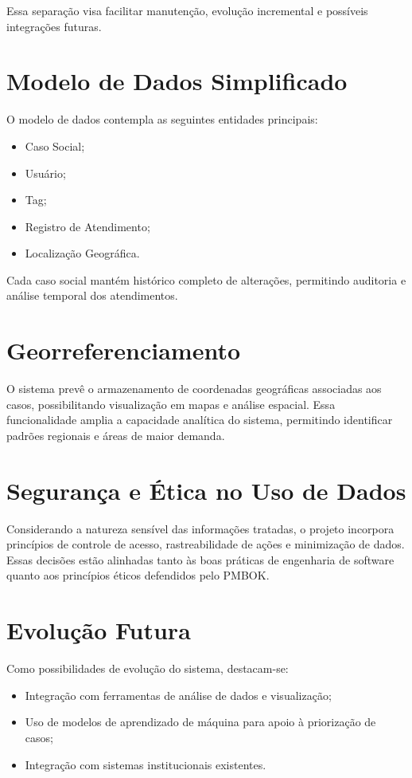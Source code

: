 Essa separação visa facilitar manutenção, evolução incremental e possíveis integrações futuras.

\section{Modelo de Dados Simplificado}

O modelo de dados contempla as seguintes entidades principais:
\begin{itemize}
    \item Caso Social;
    \item Usuário;
    \item Tag;
    \item Registro de Atendimento;
    \item Localização Geográfica.
\end{itemize}

Cada caso social mantém histórico completo de alterações, permitindo auditoria e análise temporal dos atendimentos.

\section{Georreferenciamento}

O sistema prevê o armazenamento de coordenadas geográficas associadas aos casos, possibilitando visualização em mapas e análise espacial. Essa funcionalidade amplia a capacidade analítica do sistema, permitindo identificar padrões regionais e áreas de maior demanda.

\section{Segurança e Ética no Uso de Dados}

Considerando a natureza sensível das informações tratadas, o projeto incorpora princípios de controle de acesso, rastreabilidade de ações e minimização de dados. Essas decisões estão alinhadas tanto às boas práticas de engenharia de software quanto aos princípios éticos defendidos pelo PMBOK.

\section{Evolução Futura}

Como possibilidades de evolução do sistema, destacam-se:
\begin{itemize}
    \item Integração com ferramentas de análise de dados e visualização;
    \item Uso de modelos de aprendizado de máquina para apoio à priorização de casos;
    \item Integração com sistemas institucionais existentes.
\end{itemize}

